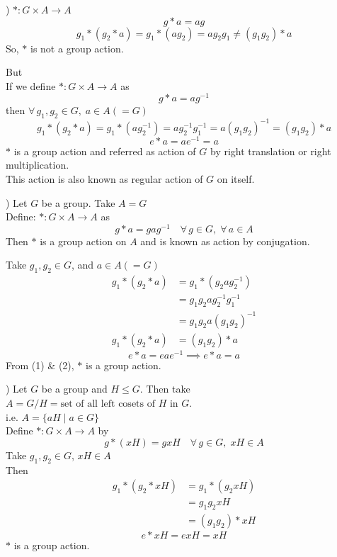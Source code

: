 \documentclass[11pt]{article}
\begin{document}
\bigskip
{}) $* : G \times A \to A$
\[
g * a = ag
\]
\[
g_1 * (g_2 * a) = g_1 * (ag_2) = ag_2 g_1 \ne (g_1 g_2) * a
\]
So, $*$ is not a group action.

\bigskip
\noindent But \\
If we define $* : G \times A \to A$ as
\[
g * a = ag^{-1}
\]
then $\forall\, g_1, g_2 \in G, \; a \in A (= G)$
\[
g_1 * (g_2 * a) = g_1 * (ag_2^{-1}) = ag_2^{-1} g_1^{-1} = a(g_1 g_2)^{-1} = (g_1 g_2) * a
\]
\[
e * a = ae^{-1} = a
\]
$*$ is a group action and referred as action of $G$ by right translation or right multiplication. \\
This action is also known as regular action of $G$ on itself.

\bigskip
{}) Let $G$ be a group. Take $A = G$ \\
Define: $* : G \times A \longrightarrow A$ as
\[
g * a = gag^{-1} \quad \forall\, g \in G, \; \forall\, a \in A
\]
Then $*$ is a group action on $A$ and is known as action by conjugation.

\noindent Take $g_1, g_2 \in G$, and $a \in A (= G)$
\begin{align}
g_1 * (g_2 * a) &= g_1 * (g_2 a g_2^{-1}) \nonumber \\
&= g_1 g_2 a g_2^{-1} g_1^{-1} \nonumber \\
&= g_1 g_2 a (g_1 g_2)^{-1} \nonumber \\
g_1 * (g_2 * a) &= (g_1 g_2) * a \tag{1}
\end{align}
\begin{equation}
e * a = eae^{-1} \implies e * a = a \tag{2}
\end{equation}
From (1) \& (2), $*$ is a group action.

\bigskip
{}) Let $G$ be a group and $H \le G$. Then take $A = G/H = \text{set of all left cosets of } H \text{ in } G$. \\
i.e. $A = \{aH \mid a \in G\}$ \\
Define $* : G \times A \to A$ by
\[
g * (xH) = gxH \quad \forall\, g \in G, \; xH \in A
\]
Take $g_1, g_2 \in G$, $xH \in A$ \\
Then
\begin{align*}
g_1 * (g_2 * xH) &= g_1 * (g_2 x H) \\
&= g_1 g_2 x H \\
&= (g_1 g_2) * xH
\end{align*}
\[
e * xH = exH = xH
\]
$*$ is a group action.
\end{document}
